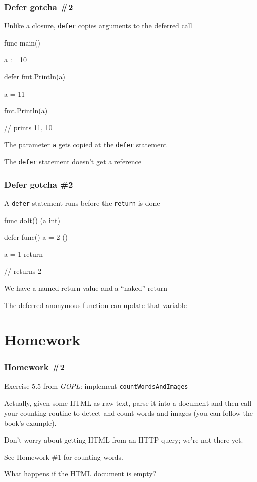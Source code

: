 \documentclass[handout,compress,t,11pt]{beamer}
\begin{document}
\begin{frame}[fragile]
    \frametitle{Defer gotcha \#2}
    Unlike a closure, \verb|defer| copies arguments to the deferred call
\begin{golang}
func main() {
	a := 10

	defer fmt.Println(a)

	a = 11

	fmt.Println(a)
}

// prints 11, 10
\end{golang}
\vspace{0.6\baselineskip}
The parameter \verb|a| gets copied at the \verb|defer| statement \par
\vspace{0.4\baselineskip}
The \verb|defer| statement doesn't get a reference
\end{frame}

\begin{frame}[fragile]
    \frametitle{Defer gotcha \#2}
    A \verb|defer| statement runs before the \verb|return| is done
\begin{golang}
func doIt() (a int) {
	defer func() {
        a = 2
    }()

	a = 1
    return
}

// returns 2
\end{golang}
\vspace{0.6\baselineskip}
We have a named return value and a ``naked'' return \par
\vspace{0.4\baselineskip}
The deferred anonymous function can update that variable
\end{frame}


\section{Homework}
\begin{frame}[fragile]
    \frametitle{Homework \#2}
    Exercise 5.5 from {\em GOPL:} implement \verb|countWordsAndImages| \par
    \vspace{\baselineskip}
    Actually, given some HTML as raw text, parse it into a document and
    then call your counting routine to detect and count words and images
    (you can follow the book's example). \par
    \vspace{\baselineskip}
    Don't worry about getting HTML from an HTTP query; we're not there yet. \par
    \vspace{\baselineskip}
    See Homework \#1 for counting words. \par
    \vspace{\baselineskip}
    What happens if the HTML document is empty? \par
\end{frame}
\end{document}
